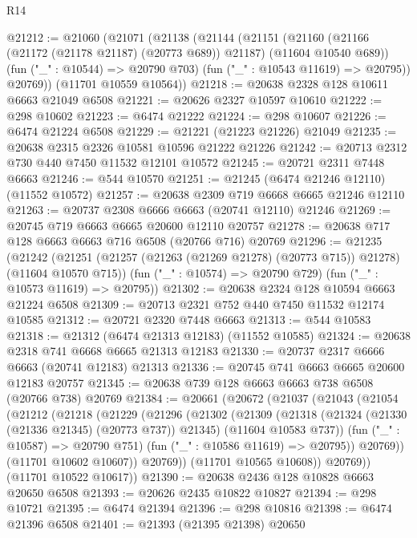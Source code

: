 \begin{lexlean}{R14}
\begin{coremodule}
{{{{{{{{{{{{{{{{{{{{{{{{{{{{{{{{{{{{{{{{{{{{{{{{{{{{{{{{{{{{{{{{{{{{{{{{{{{{{{{{{{@21212 := @21060
    (@21071
      (@21138
        (@21144
          (@21151
            (@21160 (@21166 (@21172 (@21178 @21187) (@20773 @689)) @21187) (@11604 @10540 @689))
            (fun ("_" : @10544) => @20790 @703)
            (fun ("_" : @10543 @11619) => @20795))
          @20769))
      (@11701 @10559 @10564))
@21218 := @20638 @2328 @128 @10611 @6663 @21049 @6508
@21221 := @20626 @2327 @10597 @10610
@21222 := @298 @10602
@21223 := @6474 @21222
@21224 := @298 @10607
@21226 := @6474 @21224 @6508
@21229 := @21221 (@21223 @21226) @21049
@21235 := @20638 @2315 @2326 @10581 @10596 @21222 @21226
@21242 := @20713 @2312 @730 @440 @7450 @11532 @12101 @10572
@21245 := @20721 @2311 @7448 @6663
@21246 := @544 @10570
@21251 := @21245 (@6474 @21246 @12110) (@11552 @10572)
@21257 := @20638 @2309 @719 @6668 @6665 @21246 @12110
@21263 := @20737 @2308 @6666 @6663 (@20741 @12110) @21246
@21269 := @20745 @719 @6663 @6665 @20600 @12110 @20757
@21278 := @20638 @717 @128 @6663 @6663 @716 @6508 (@20766 @716) @20769
@21296 := @21235
    (@21242
      (@21251 (@21257 (@21263 (@21269 @21278) (@20773 @715)) @21278) (@11604 @10570 @715))
      (fun ("_" : @10574) => @20790 @729)
      (fun ("_" : @10573 @11619) => @20795))
@21302 := @20638 @2324 @128 @10594 @6663 @21224 @6508
@21309 := @20713 @2321 @752 @440 @7450 @11532 @12174 @10585
@21312 := @20721 @2320 @7448 @6663
@21313 := @544 @10583
@21318 := @21312 (@6474 @21313 @12183) (@11552 @10585)
@21324 := @20638 @2318 @741 @6668 @6665 @21313 @12183
@21330 := @20737 @2317 @6666 @6663 (@20741 @12183) @21313
@21336 := @20745 @741 @6663 @6665 @20600 @12183 @20757
@21345 := @20638 @739 @128 @6663 @6663 @738 @6508 (@20766 @738) @20769
@21384 := @20661
    (@20672
      (@21037
        (@21043
          (@21054
            (@21212
              (@21218
                (@21229
                  (@21296
                    (@21302
                      (@21309
                        (@21318
                          (@21324 (@21330 (@21336 @21345) (@20773 @737)) @21345)
                          (@11604 @10583 @737))
                        (fun ("_" : @10587) => @20790 @751)
                        (fun ("_" : @10586 @11619) => @20795))
                      @20769))
                  (@11701 @10602 @10607))
                @20769))
            (@11701 @10565 @10608))
          @20769))
      (@11701 @10522 @10617))
@21390 := @20638 @2436 @128 @10828 @6663 @20650 @6508
@21393 := @20626 @2435 @10822 @10827
@21394 := @298 @10721
@21395 := @6474 @21394
@21396 := @298 @10816
@21398 := @6474 @21396 @6508
@21401 := @21393 (@21395 @21398) @20650
}}}}}}}}}}}}}}}}}}}}}}}}}}}}}}}}}}}}}}}}}}}}}}}}}}}}}}}}}}}}}}}}}}}}}}}}}}}}}}}}}}
\end{coremodule}
\end{lexlean}
